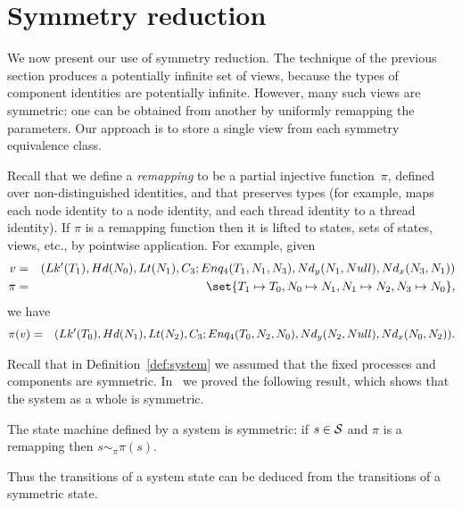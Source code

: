\section{Symmetry reduction}
\label{sec:symmetry}

We now present our use of symmetry reduction.  The technique of the previous
section produces a potentially infinite set of views, because the types of
component identities are potentially infinite.  However, many such views are
symmetric: one can be obtained from another by uniformly remapping the
parameters.  Our approach is to store a single view from each symmetry
equivalence class.   

Recall that we define a \emph{remapping} to be a partial injective
function~$\pi$, defined over non-distinguished identities, and that preserves
types (for example, maps each node identity to a node identity, and each
thread identity to a thread identity).
%
If $\pi$ is a remapping function then it is lifted to states, sets of states,
views,
etc., by pointwise application.  For example, given
%
\begin{eqnarray*}
v & = & 
  \begin{align}
  (\Lock'(T_1), \Head(N_0), \Last(N_1), \Con_3; 
    Enq_4(T_1, N_1, N_3), \Node_y(N_1, Null),\Node_x(N_3, N_1))
  \end{align} \\
\pi & = & 
  \set{ T_1 \mapsto T_0, N_0 \mapsto N_1, N_1 \mapsto N_2, N_3 \mapsto N_0 },
\end{eqnarray*}
%
we have 
\begin{eqnarray*}
\pi(v) & = & 
  \begin{align}
  (\Lock'(T_0), \Head(N_1), \Last(N_2), \Con_3; 
   Enq_4(T_0, N_2, N_0), \Node_y(N_2, Null),\Node_x(N_0, N_2)) .
  \end{align}
\end{eqnarray*}


Recall that in Definition~\ref{def:system} we assumed that the fixed processes
and components are symmetric.  In~\cite{gavin:view-abs} we proved the
following result, which shows that the system as a whole is symmetric.
%
\begin{lemma}
\label{lem:system-pi-bisimilar}
The state machine defined by a system is symmetric: if $s \in \S$ and
$\pi$ is a remapping then $s \sim_\pi \pi(s)$.
\end{lemma}
%
Thus the transitions of a system state can be deduced from the transitions of
a symmetric state.

